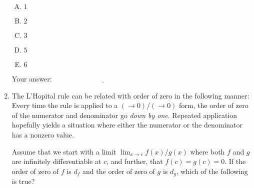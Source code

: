\documentclass[10pt]{amsart}
\begin{document}
\begin{enumerate}
  \begin{enumerate}[(A)]
  \item $1$
  \item $2$
  \item $3$
  \item $5$
  \item $6$
  \end{enumerate}

  \vspace{0.1in}
  Your answer: $\underline{\qquad\qquad\qquad\qquad\qquad\qquad\qquad}$
  \vspace{0.15in}

\item The L'Hopital rule can be related with order of zero in the
  following manner: Every time the rule is applied to a $(\to 0)/(\to
  0)$ form, the order of zero of the numerator and denominator go {\em
    down by one}. Repeated application hopefully yields a situation
  where either the numerator or the denominator has a nonzero value.

  Assume that we start with a limit $\lim_{x \to c} f(x)/g(x)$ where
  both $f$ and $g$ are infinitely differentiable at $c$, and further,
  that $f(c) = g(c) = 0$. If the order of zero of $f$ is $d_f$ and the
  order of zero of $g$ is $d_g$, which of the
  following is true?


\end{enumerate}
\end{document}

